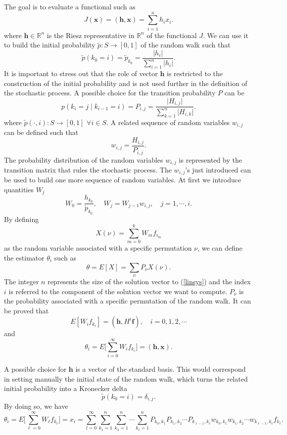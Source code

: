 The goal is to evaluate a functional such as
\[
J(\mathbf{x})=(\mathbf{h},\mathbf{x})=\sum_{i=1}^n h_i x_i.
\]
where $\mathbf{h}\in \mathbb{R}^n$ is the Riesz representative in
$\mathbb{R}^n$ of the functional $J$.
We can use it to build the initial probability $\tilde{p}:
S\rightarrow [0,1]$ of the random walk such that
\[
\tilde{p}(k_0=i)=\tilde{p}_{k_0}=\frac{\lvert h_i\rvert}{\sum_{i=1}^n \lvert
h_i\rvert}.
\]
It is important to stress out that the role of vector $\mathbf{h}$ is
restricted to the construction of the initial probability and is not
used further in the definition of the stochastic process.
A possible choice for the transition probability $P$ can be
\[
p(k_i=j \;\lvert\;k_{i-1}=i )=P_{i,j}=\frac{\lvert H_{i,j}\rvert}{\sum_{k=1}^n
\lvert H_{i,k}\rvert}.
\]
where $\tilde{p}(\cdot,i):S\rightarrow [0,1]$ $\forall i\in S$.
A related sequence of random variables $w_{i,j}$ can be defined
such that
\[
w_{i,j}=\frac{H_{i,j}}{P_{i,j}}.
\]
The probability distribution of the random variables $w_{i,j}$ is represented
by the transition matrix that rules the stochastic process. The $w_{i,j}$'s
just introduced can be used to build one more sequence
of random variables.
At first we introduce quantities $W_j$
\[
W_{0}=\frac{h_{k_0}}{\tilde{p}_{k_0}}, \quad W_j=W_{j-1} w_{i,j}, \quad
j=1,\cdots, i.
\]
By defining
\[
X(\nu)=\sum_{m=0}^k W_m f_{i_m}
\]
as the random variable associated with a specific permutation $\nu$, we can
define the estimator $\theta_i$ such as
\[
\theta=E[X]=\sum_{\nu}P_{\nu}X(\nu).
\]
The integer $n$ represents the size of the solution vector to (\ref{linsys})
and
the
index
$i$
is referred to the component of the solution vector we want to compute.
$P_{\nu}$ is the probability associated with a specific permutation of the
random walk.
It can be proved that
\[
E[W_i f_{k_i}]=(\mathbf{h},H^i\mathbf{f}), \quad i=0,1,2,\cdots
\]
and
\[
\theta_i=E\bigg[\sum_{i=0}^\infty W_i f_{k_i}\bigg]=(\mathbf{h},\mathbf{x}).
\]

A possible choice for $\mathbf{h}$ is a vector of the standard basis. This
would correspond in setting manually the initial state of the random walk,
which turns the related initial probability into a Kronecker delta
\[
\tilde{p}(k_0=i)=\delta_{i,j}.
\]
By doing so, we have
\begin{equation}
\theta_i=E\bigg[\sum_{\ell=0}^\infty W_{\ell}
f_{k_{\ell}}\bigg]=x_i=\sum_{l=0}^\infty
\sum_{k_1=1}^{n}\sum_{k_2=1}^n\cdots \sum_{k_{\ell}=1}^n
P_{k_0,k_1}P_{k_1,k_2}\cdots P_{k_{\ell-1},
k_{\ell}}w_{k_0,k_1}w_{k_1,k_2}\cdots
w_{k_{\ell-1}, k_{\ell}}f_{k_{\ell}}.
\label{dir_mean}
\end{equation}

